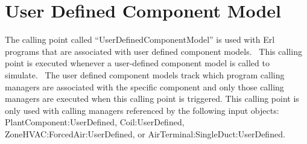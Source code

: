 \section{User Defined Component Model}\label{user-defined-component-model}

The calling point called ``UserDefinedComponentModel'' is used with Erl programs that are associated with user defined component models.~ This calling point is executed whenever a user-defined component model is called to simulate.~ The user defined component models track which program calling managers are associated with the specific component and only those calling managers are executed when this calling point is triggered. This calling point is only used with calling managers referenced by the following input objects: PlantComponent:UserDefined, Coil:UserDefined, ZoneHVAC:ForcedAir:UserDefined, or AirTerminal:SingleDuct:UserDefined.
